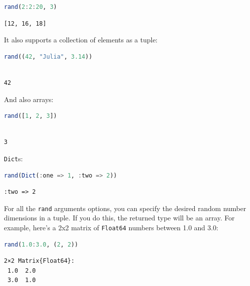 \documentclass[
  notoc %
]{tufte-book}
\newcommand{\passthrough}[1]{#1}
\begin{document}
\begin{lstlisting}[language=Julia]
rand(2:2:20, 3)
\end{lstlisting}

\begin{lstlisting}[language=Output]
[12, 16, 18]
\end{lstlisting}

It also supports a collection of elements as a tuple:

\begin{lstlisting}[language=Julia]
rand((42, "Julia", 3.14))
\end{lstlisting}

\begin{lstlisting}[language=Output]

42

\end{lstlisting}

And also arrays:

\begin{lstlisting}[language=Julia]
rand([1, 2, 3])
\end{lstlisting}

\begin{lstlisting}[language=Output]

3

\end{lstlisting}

\passthrough{\lstinline!Dict!}s:

\begin{lstlisting}[language=Julia]
rand(Dict(:one => 1, :two => 2))
\end{lstlisting}

\begin{lstlisting}[language=Output]
:two => 2
\end{lstlisting}

For all the \passthrough{\lstinline!rand!} arguments options, you can
specify the desired random number dimensions in a tuple. If you do this,
the returned type will be an array. For example, here's a 2x2 matrix of
\passthrough{\lstinline!Float64!} numbers between 1.0 and 3.0:

\begin{lstlisting}[language=Julia]
rand(1.0:3.0, (2, 2))
\end{lstlisting}

\begin{lstlisting}[language=Output]
2×2 Matrix{Float64}:
 1.0  2.0
 3.0  1.0
\end{lstlisting}
\end{document}
